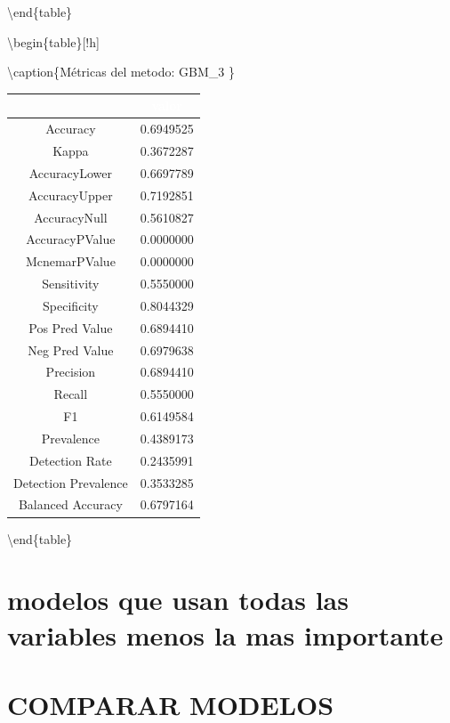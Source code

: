\documentclass[]{article}
\begin{document}
\textbackslash{}end\{table\}

\textbackslash{}begin\{table\}{[}!h{]}

\textbackslash{}caption\{\label{tab:metricas_GBM_3}Métricas del metodo:
GBM\_3 \} \centering

\begin{tabular}[t]{cc}
\toprule
\rowcolor{black}  \multicolumn{1}{c}{\textcolor{white}{\textbf{metricas}}} & \multicolumn{1}{c}{\textcolor{white}{\textbf{valor}}}\\
\midrule
\rowcolor{gray!6}  Accuracy & 0.6949525\\
Kappa & 0.3672287\\
\rowcolor{gray!6}  AccuracyLower & 0.6697789\\
AccuracyUpper & 0.7192851\\
\rowcolor{gray!6}  AccuracyNull & 0.5610827\\
\addlinespace
AccuracyPValue & 0.0000000\\
\rowcolor{gray!6}  McnemarPValue & 0.0000000\\
Sensitivity & 0.5550000\\
\rowcolor{gray!6}  Specificity & 0.8044329\\
Pos Pred Value & 0.6894410\\
\addlinespace
\rowcolor{gray!6}  Neg Pred Value & 0.6979638\\
Precision & 0.6894410\\
\rowcolor{gray!6}  Recall & 0.5550000\\
F1 & 0.6149584\\
\rowcolor{gray!6}  Prevalence & 0.4389173\\
\addlinespace
Detection Rate & 0.2435991\\
\rowcolor{gray!6}  Detection Prevalence & 0.3533285\\
Balanced Accuracy & 0.6797164\\
\bottomrule
\end{tabular}

\textbackslash{}end\{table\}

\hypertarget{modelos-que-usan-todas-las-variables-menos-la-mas-importante}{%
\section{modelos que usan todas las variables menos la mas
importante}\label{modelos-que-usan-todas-las-variables-menos-la-mas-importante}}

\hypertarget{comparar-modelos}{%
\section{COMPARAR MODELOS}\label{comparar-modelos}}
\end{document}
